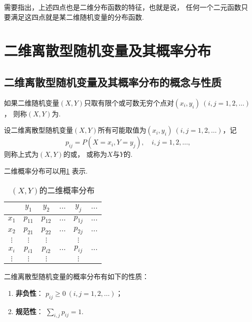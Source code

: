 需要指出，上述四点也是二维分布函数的特征，也就是说，
任何一个二元函数只要满足这四点就是某二维随机变量的分布函数.

\section{二维离散型随机变量及其概率分布}

\subsection{二维离散型随机变量及其概率分布的概念与性质}
\begin{definition}
如果二维随机变量\((X,Y)\)只取有限个或可数无穷个点对\((x_i,y_i)\ (i,j=1,2,\dotsc)\)，
则称\((X,Y)\)为.
\end{definition}

\begin{definition}
设二维离散型随机变量\((X,Y)\)所有可能取值为\((x_i,y_i)\ (i,j=1,2,\dotsc)\)，记\[
p_{ij} = P(X = x_i, Y = y_j), \quad i,j = 1,2,\dotsc,
\]则称上式为\((X,Y)\)的或，
或称为\(X\)与\(Y\)的.
\end{definition}

二维概率分布可以用\cref{table:多维随机变量及其分布.二维概率分布} 表示.

\begin{table}[ht]
\centering
\begin{tabular}{c|*5c}
	& \(y_1\) & \(y_2\) & \(\dots\) & \(y_j\) & \(\dots\) \\ \hline
\(x_1\) & \(p_{11}\) & \(p_{12}\) & \(\dots\) & \(p_{1j}\) & \(\dotsc\) \\
\(x_2\) & \(p_{21}\) & \(p_{22}\) & \(\dots\) & \(p_{2j}\) & \(\dotsc\) \\
\(\vdots\) & \(\vdots\) & \(\vdots\) & & \(\vdots\) \\
\(x_i\) & \(p_{i1}\) & \(p_{i2}\) & \(\dots\) & \(p_{ij}\) & \(\dotsc\) \\
\(\vdots\) & \(\vdots\) & \(\vdots\) & & \(\vdots\) \\
\end{tabular}
\caption{\((X,Y)\)的二维概率分布}
\label{table:多维随机变量及其分布.二维概率分布}
\end{table}

\begin{property}
二维离散型随机变量的概率分布有如下的性质：
\begin{enumerate}
	\item {\bf 非负性}：
	\(p_{ij} \geq 0\ (i,j=1,2,\dotsc)\)；

	\item {\bf 规范性}：
	\(\sum_{i,j} p_{ij} = 1\).
\end{enumerate}
\end{property}

